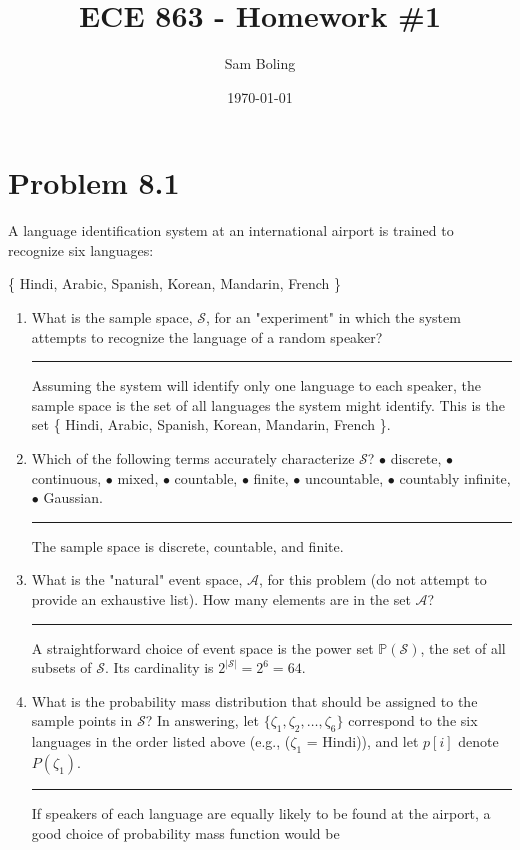 \documentclass{article}
\title{ECE 863 - Homework \#1}
\author{Sam Boling}
\date{\today}
\newcommand{\horline}
           {\begin{center}
              \noindent\rule{8cm}{0.4pt}
            \end{center}}
\begin{document}
\maketitle

\section*{Problem 8.1}
A language identification system at an international airport is trained
to recognize six languages:

\begin{center}
  \{ Hindi, Arabic, Spanish, Korean, Mandarin, French \}
\end{center}

\begin{enumerate}[label=(\alph*)]
\item{What is the sample space, $\mathcal{S}$, for an "experiment" in which
      the system attempts to recognize the language of a random speaker?
      \horline      
      Assuming the system will identify only one language to each speaker,
      the sample space is the set of all languages the system might
      identify. This is the set \{ Hindi, Arabic, Spanish, Korean, 
      Mandarin, French \}.
     }
\item{Which of the following terms accurately characterize $\mathcal{S}$?
      $\bullet$ discrete, $\bullet$ continuous, $\bullet$ mixed, 
      $\bullet$ countable, $\bullet$ finite, $\bullet$ uncountable, 
      $\bullet$ countably infinite, $\bullet$ Gaussian.
      \horline
      The sample space is discrete, countable, and finite.
     }
\item{What is the "natural" event space, $\mathcal{A}$, for this problem
      (do not attempt to provide an exhaustive list). How many elements
      are in the set $\mathcal{A}$?
      \horline
      A straightforward choice of event space is the power set 
      $\mathbb{P}(\mathcal{S})$, the set of all subsets of $\mathcal{S}$.
      Its cardinality is $2^{|\mathcal{S}|} = 2^6 = 64$.
     }
\item{What is the probability mass distribution that should be assigned to
      the sample points in $\mathcal{S}$? In answering, let 
      $\{\zeta_1, \zeta_2, \dots, \zeta_6\}$ correspond to the six languages
      in the order listed above (e.g., ($\zeta_1$ = Hindi)), and let $p[i]$
      denote $P(\zeta_1)$.
      \horline
      If speakers of each language are equally likely to be found
      at the airport, a good choice of probability mass function would be
}
\end{enumerate}
\end{document}
